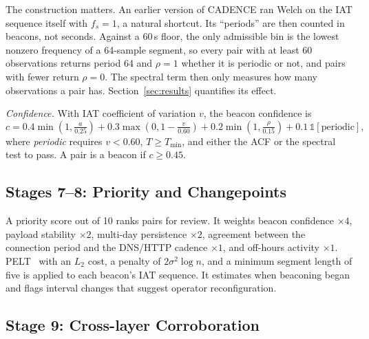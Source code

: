 \documentclass[runningheads]{llncs}
\begin{document}
The construction matters. An earlier version of CADENCE ran Welch on the IAT sequence itself with $f_s = 1$, a natural shortcut. Its ``periods'' are then counted in beacons, not seconds. Against a 60\,s floor, the only admissible bin is the lowest nonzero frequency of a 64-sample segment, so every pair with at least 60 observations returns period 64 and $\rho = 1$ whether it is periodic or not, and pairs with fewer return $\rho=0$. The spectral term then only measures how many observations a pair has. Section~\ref{sec:results} quantifies its effect.

\emph{Confidence.} With IAT coefficient of variation $v$, the beacon confidence is
\begin{equation}
c = 0.4\min\!\left(1,\tfrac{a}{0.25}\right) + 0.3\max\!\left(0, 1-\tfrac{v}{0.60}\right) + 0.2\min\!\left(1,\tfrac{\rho}{0.15}\right) + 0.1\,\mathbb{1}[\text{periodic}],
\end{equation}
where \emph{periodic} requires $v < 0.60$, $T \ge T_{\min}$, and either the ACF or the spectral test to pass. A pair is a beacon if $c \ge 0.45$.

\subsection{Stages 7--8: Priority and Changepoints}

A priority score out of 10 ranks pairs for review. It weights beacon confidence $\times4$, payload stability $\times2$, multi-day persistence $\times2$, agreement between the connection period and the DNS/HTTP cadence $\times1$, and off-hours activity $\times1$. PELT~\cite{killick2012pelt} with an $L_2$ cost, a penalty of $2\sigma^2\log n$, and a minimum segment length of five is applied to each beacon's IAT sequence. It estimates when beaconing began and flags interval changes that suggest operator reconfiguration.

\subsection{Stage 9: Cross-layer Corroboration}
\end{document}
